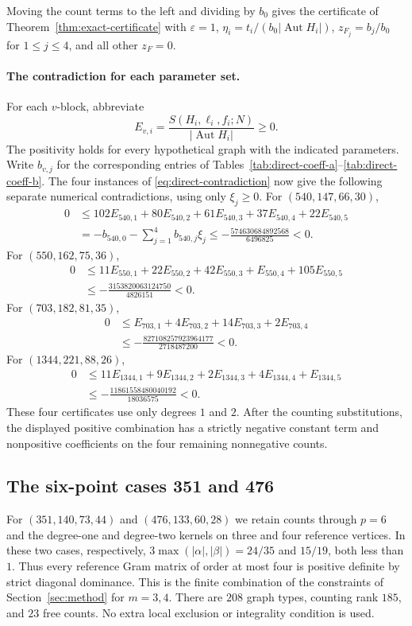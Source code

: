 \documentclass[11pt]{article}
\theoremstyle{remark}
\DeclareMathOperator{\Aut}{Aut}
\numberwithin{equation}{section}
\begin{document}
Moving the count terms to the left and dividing by $b_0$ gives
the certificate of Theorem~\ref{thm:exact-certificate} with
$\varepsilon=1$, $\eta_i=t_i/(b_0|\Aut H_i|)$,
$z_{F_j}=b_j/b_0$ for $1\le j\le4$, and all other $z_F=0$.

\paragraph{The contradiction for each parameter set.}
For each $v$-block, abbreviate
\[
 E_{v,i}=\frac{S(H_i,\ell_i,f_i;N)}{|\operatorname{Aut}H_i|}\ge0.
\]
The positivity holds for every hypothetical graph with the indicated
parameters. Write $b_{v,j}$ for the corresponding entries of
Tables~\ref{tab:direct-coeff-a}--\ref{tab:direct-coeff-b}.
The four instances of \eqref{eq:direct-contradiction} now give the
following separate numerical contradictions, using only $\xi_j\ge0$.
For $(540,147,66,30)$,
\begin{align}
0&\le 102E_{540,1}+80E_{540,2}+61E_{540,3}
       +37E_{540,4}+22E_{540,5}\nonumber\\
 &= -b_{540,0}-\sum_{j=1}^4b_{540,j}\xi_j
 \le-\frac{574630684892568}{6496825}<0.\label{eq:contradiction-540}
\end{align}
For $(550,162,75,36)$,
\begin{align}
0&\le11E_{550,1}+22E_{550,2}+42E_{550,3}
       +E_{550,4}+105E_{550,5}\nonumber\\
 &\le-\frac{3153820063124750}{4826151}<0.\label{eq:contradiction-550}
\end{align}
For $(703,182,81,35)$,
\begin{align}
0&\le E_{703,1}+4E_{703,2}+14E_{703,3}+2E_{703,4}\nonumber\\
 &\le-\frac{827108257923964177}{2718487200}<0.\label{eq:contradiction-703}
\end{align}
For $(1344,221,88,26)$,
\begin{align}
0&\le11E_{1344,1}+9E_{1344,2}+2E_{1344,3}
       +4E_{1344,4}+E_{1344,5}\nonumber\\
 &\le-\frac{11861558480040192}{18036575}<0.\label{eq:contradiction-1344}
\end{align}
These four certificates use only degrees $1$ and $2$.
After the counting substitutions, the displayed positive combination
has a strictly negative constant term and nonpositive coefficients
on the four remaining nonnegative counts.

\subsection{The six-point cases 351 and 476}
For $(351,140,73,44)$ and $(476,133,60,28)$ we retain counts through
$p=6$ and the degree-one and degree-two kernels on three and four
reference vertices. In these two cases, respectively,
$3\max(|\alpha|,|\beta|)=24/35$ and $15/19$, both less than $1$.
Thus every reference Gram matrix of order at most four is positive
definite by strict diagonal dominance. This is the finite combination of the constraints
of Section~\ref{sec:method} for $m=3,4$.  There are $208$ graph types, counting rank
$185$, and $23$ free counts.  No extra local exclusion or integrality
condition is used.
\end{document}
